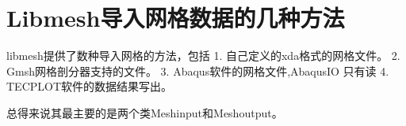 

\section{Libmesh导入网格数据的几种方法}
libmesh提供了数种导入网格的方法，包括
1.	自己定义的xda格式的网格文件。
2.	Gmsh网格剖分器支持的文件。
3.	Abaqus软件的网格文件,AbaqusIO 只有读
4.	TECPLOT软件的数据结果写出。

总得来说其最主要的是两个类Meshinput和Meshoutput。

\newpage
